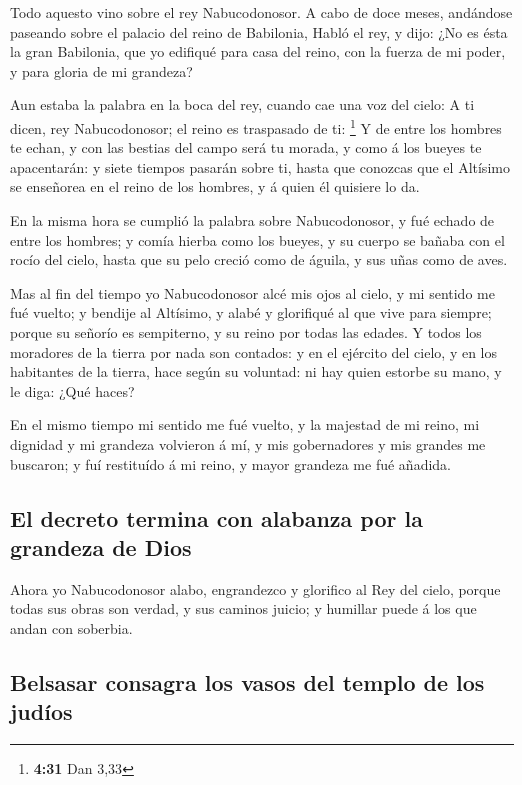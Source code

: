  Todo aquesto vino sobre el rey Nabucodonosor.
 A cabo de doce meses, andándose paseando sobre el palacio
del reino de Babilonia,  Habló el rey, y dijo: ¿No es ésta
la gran Babilonia, que yo edifiqué para casa del reino, con la fuerza de
mi poder, y para gloria de mi grandeza?

 Aun estaba la palabra en la boca del rey, cuando cae una
voz del cielo: A ti dicen, rey Nabucodonosor; el reino es traspasado de
ti: \footnote{\textbf{4:31} Dan 3,33}  Y de entre los
hombres te echan, y con las bestias del campo será tu morada, y como á
los bueyes te apacentarán: y siete tiempos pasarán sobre ti, hasta que
conozcas que el Altísimo se enseñorea en el reino de los hombres, y á
quien él quisiere lo da.

 En la misma hora se cumplió la palabra sobre
Nabucodonosor, y fué echado de entre los hombres; y comía hierba como
los bueyes, y su cuerpo se bañaba con el rocío del cielo, hasta que su
pelo creció como de águila, y sus uñas como de aves.

 Mas al fin del tiempo yo Nabucodonosor alcé mis ojos al
cielo, y mi sentido me fué vuelto; y bendije al Altísimo, y alabé y
glorifiqué al que vive para siempre; porque su señorío es sempiterno, y
su reino por todas las edades.  Y todos los moradores de la
tierra por nada son contados: y en el ejército del cielo, y en los
habitantes de la tierra, hace según su voluntad: ni hay quien estorbe su
mano, y le diga: ¿Qué haces?

 En el mismo tiempo mi sentido me fué vuelto, y la majestad
de mi reino, mi dignidad y mi grandeza volvieron á mí, y mis
gobernadores y mis grandes me buscaron; y fuí restituído á mi reino, y
mayor grandeza me fué añadida.

\hypertarget{el-decreto-termina-con-alabanza-por-la-grandeza-de-dios}{%
\subsection{El decreto termina con alabanza por la grandeza de
Dios}\label{el-decreto-termina-con-alabanza-por-la-grandeza-de-dios}}

 Ahora yo Nabucodonosor alabo, engrandezco y glorifico al
Rey del cielo, porque todas sus obras son verdad, y sus caminos juicio;
y humillar puede á los que andan con soberbia.

\hypertarget{belsasar-consagra-los-vasos-del-templo-de-los-juduxedos}{%
\subsection{Belsasar consagra los vasos del templo de los
judíos}\label{belsasar-consagra-los-vasos-del-templo-de-los-juduxedos}}

